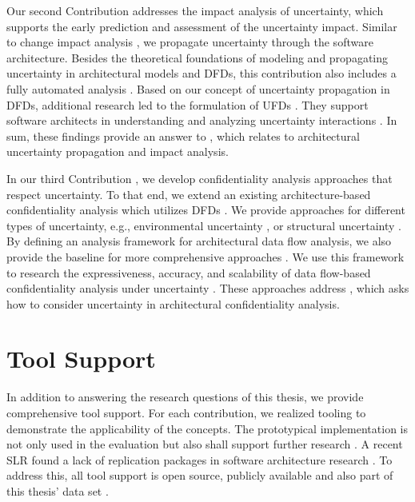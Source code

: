 Our second Contribution  addresses the impact analysis of uncertainty, which supports the early prediction and assessment of the uncertainty impact.
Similar to change impact analysis \cite{rostami_architecture-based_2015,rostami_architecture-based_2017}, we propagate uncertainty through the software architecture.
Besides the theoretical foundations of modeling and propagating uncertainty in architectural models and \acp{DFD}, this contribution also includes a fully automated analysis \cite{hahner_architecture-based_2023}.
Based on our concept of uncertainty propagation in \acp{DFD}, additional research led to the formulation of \acp{UFD} \cite{camara_uncertainty_2024}.
They support software architects in understanding and analyzing uncertainty interactions \cite{camara_addressing_2022}.
In sum, these findings provide an answer to , which relates to architectural uncertainty propagation and impact analysis.

In our third Contribution , we develop confidentiality analysis approaches that respect uncertainty.
To that end, we extend an existing architecture-based confidentiality analysis which utilizes \acp{DFD} \cite{seifermann_architectural_2022,seifermann_detecting_2022}.
We provide approaches for different types of uncertainty, e.g., environmental uncertainty \cite{boltz_handling_2022}, or structural uncertainty \cite{walter_architectural_2022}.
By defining an analysis framework for architectural data flow analysis, we also provide the baseline for more comprehensive approaches \cite{boltz_extensible_2024}.
We use this framework to research the expressiveness, accuracy, and scalability of data flow-based confidentiality analysis under uncertainty \cite{hahner_model-based_2023}.
These approaches address , which asks how to consider uncertainty in architectural confidentiality analysis. 





\section{Tool Support}%
\label{sec:overview:toolsupport}

In addition to answering the research questions of this thesis, we provide comprehensive tool support.
For each contribution, we realized tooling to demonstrate the applicability of the concepts.
The prototypical implementation is not only used in the evaluation but also shall support further research \cite{boltz_extensible_2024}.
A recent \acf{SLR} found a lack of replication packages in software architecture research \cite{konersmann_evaluation_2022}.
To address this, all tool support is open source, publicly available and also part of this thesis' data set \cite{dataset}.

